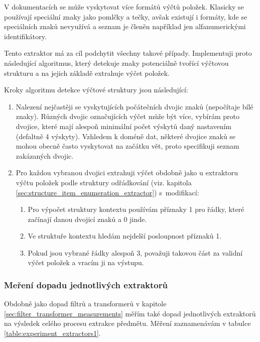 \documentclass[thesis=M,czech]{FITthesis}[2019/12/23]
\begin{document}
V dokumentacích se může vyskytovat více formátů výčtů položek. Klasicky se používají speciální znaky jako pomlčky a tečky, avšak existují i formáty, kde se speciálních znaků nevyužívá a seznam je členěn například jen alfanumerickými identifikátory.

Tento extraktor má za cíl podchytit všechny takové případy. Implementuji proto následující algoritmus, který detekuje znaky potenciálně tvořící výčtovou strukturu a na jejich základě extrahuje výčet položek.

\newpage
Kroky algoritmu detekce výčtové struktury jsou následující:
\begin{enumerate}
    \item Nalezení nejčastěji se vyskytujících počátečních dvojic znaků (nepočítaje bílé znaky). Různých dvojic označujících výčet může být více, vybírám proto dvojice, které mají alespoň minimální počet výskytů daný nastavením (defaltně 4 výskyty). Vzhledem k doméně dat, některé dvojice znaků se mohou obecně často vyskytovat na začátku vět, proto specifikuji seznam zakázaných dvojic.
    \item Pro každou vybranou dvojici extrahuji výčet obdobně jako u extraktoru výčtu položek podle struktury odřádkování (viz. kapitola \ref{sec:structure_item_enumeration_extractor}) s~modifikací:
    \begin{enumerate}
        \item Pro výpočet struktury kontextu používám příznaky 1 pro řádky, které začínají danou dvojicí znaků a 0 jinde.
        \item Ve struktuře kontextu hledám nejdelší posloupnost příznaků 1.
        \item Pokud jsou vybrané řádky alespoň 3, považuji takovou část za validní výčet položek a vracím ji na výstupu.
    \end{enumerate} 
\end{enumerate}

\subsubsection{Meření dopadu jednotlivých extraktorů}

Obdobně jako dopad filtrů a transformerů v kapitole \ref{sec:filter_transformer_measurements} měřím také dopad jednotlivých extraktorů na výsledek celého procesu extrakce předmětu. Měření zaznamenávám v tabulce \ref{table:experiment_extractors1}.
\end{document}
